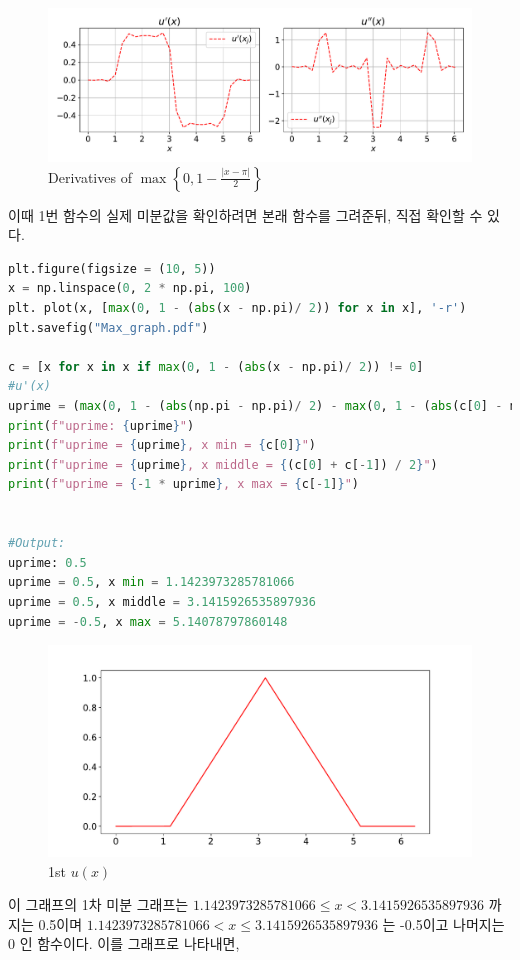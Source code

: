 \documentclass[11pt]{article}
\begin{document}
\begin{figure}[!ht]
  \centering
  \includegraphics[width=1\textwidth]{Differntiation_1.pdf}
  \caption{Derivatives of $ \max\left\{0, 1 - \frac{|x - \pi|}{2}\right\}$}
\end{figure}

이때 1번 함수의 실제 미분값을 확인하려면 본래 함수를 그려준뒤, 직접 확인할 수 있다. 
\begin{lstlisting}[language=Python]
plt.figure(figsize = (10, 5))
x = np.linspace(0, 2 * np.pi, 100)
plt. plot(x, [max(0, 1 - (abs(x - np.pi)/ 2)) for x in x], '-r')
plt.savefig("Max_graph.pdf")

c = [x for x in x if max(0, 1 - (abs(x - np.pi)/ 2)) != 0]
#u'(x)
uprime = (max(0, 1 - (abs(np.pi - np.pi)/ 2) - max(0, 1 - (abs(c[0] - np.pi)/ 2))) / (np.pi - c[0]))
print(f"uprime: {uprime}")
print(f"uprime = {uprime}, x min = {c[0]}")
print(f"uprime = {uprime}, x middle = {(c[0] + c[-1]) / 2}")
print(f"uprime = {-1 * uprime}, x max = {c[-1]}")


#Output:
uprime: 0.5
uprime = 0.5, x min = 1.1423973285781066
uprime = 0.5, x middle = 3.1415926535897936
uprime = -0.5, x max = 5.14078797860148

\end{lstlisting}

\begin{figure}[!ht]
  \centering
  \includegraphics[width=1\textwidth]{Max_graph.pdf}
  \caption{1st $u(x)$}
\end{figure}
이 그래프의 1차 미분 그래프는 $1.1423973285781066 \le x  < 3.1415926535897936$ 까지는 0.5이며 $1.1423973285781066 <  x  \le 3.1415926535897936$ 는 -0.5이고 나머지는 0 인 함수이다. 이를 그래프로 나타내면,
\end{document}
